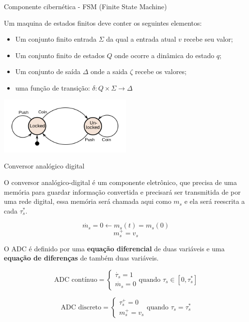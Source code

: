 \documentclass{beamer}
\begin{document}
\begin{frame}{Componente cibernética - FSM (Finite State Machine)}
	\par Um maquina de estados finitos deve conter os seguintes elementos:
	\begin{itemize}
		\item Um conjunto finito entrada $\Sigma$ da qual a entrada atual $v$ recebe seu valor;
		\item Um conjunto finito de estados $Q$ onde ocorre a dinâmica do estado $q$;
		\item Um conjunto de saída $\Delta$ onde a saida $\zeta$ recebe os valores;
		\item uma função de transição: $\delta: Q \times \Sigma \rightarrow \Delta$
	\end{itemize}
	\begin{center}
		\includegraphics[width=0.5\textwidth]{imagens/fsm.png}
	\end{center}
\end{frame}

\begin{frame}{Conversor analógico digital}
	\par O conversor analógico-digital é um componente eletrônico, que precisa de uma memória para guardar informação convertida e precisará ser transmitida de por uma rede digital, essa memória será chamada aqui como $m_s$ e ela será reescrita a cada $\tau_s^{*}$.
	
	\begin{equation}
		\dot{m_s} = 0 \leftarrow m_s(t) = m_s(0)
	\end{equation}
	\begin{equation}
		m_s^{+} = v_s
	\end{equation}
	
	\par O ADC é definido por uma \textbf{equação diferencial} de duas variáveis e uma \textbf{equação de diferenças} de também duas variáveis.
	
	\begin{equation}
		\text{ADC contínuo} =
		\begin{cases}
			\dot{\tau_s} = 1\\
			\dot{m_s} = 0
		\end{cases}
		\text{quando $\tau_s \in [0,\tau_s^{*}]$}
	\end{equation}
	
	\begin{equation}
		\text{ADC discreto} =
		\begin{cases}
			\tau_s^{+} = 0\\
			m_s^{+} = v_s
		\end{cases}
		\text{quando $\tau_s = \tau_s^{*}$}
	\end{equation}
\end{frame}
\end{document}
